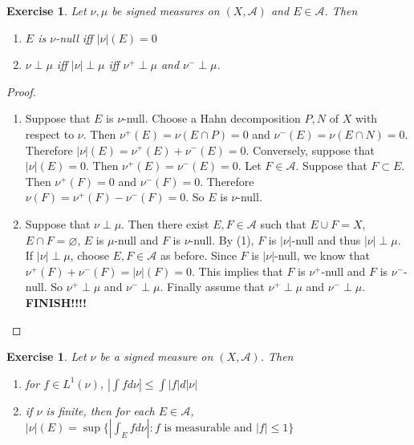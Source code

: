\documentclass[12pt]{amsart}
\newtheorem{ex}[thm]{Exercise}
\newcommand{\MA}{\mathcal{A}}
\begin{document}
	\begin{ex}
		Let $\nu, \mu$ be signed measures on $(X,\MA)$ and $E \in \MA$. Then 
		\begin{enumerate}
			\item $E$ is $\nu$-null iff $|\nu|(E) = 0$
			\item $\nu \perp \mu$ iff $|\nu| \perp \mu$ iff $\nu^+ \perp \mu$ and $\nu^- \perp \mu$.
		\end{enumerate}
	\end{ex}
	
	\begin{proof}
		\begin{enumerate}
			\item Suppose that $E$ is $\nu$-null. Choose a Hahn decomposition $P,N$ of $X$ with respect to $\nu$. Then $\nu^+(E) = \nu(E \cap P) = 0$ and $\nu^-(E) = \nu(E \cap N) = 0$. Therefore $|\nu|(E) = \nu^+(E) + \nu^-(E) = 0$. Conversely, suppose that $|\nu|(E) = 0$. Then $\nu^+(E) = \nu^-(E) = 0$. Let $F \in \MA$. Suppose that $F \subset E$. Then $\nu^+(F) = 0$ and $\nu^-(F) = 0$. Therefore $\nu(F) = \nu^+(F) - \nu^-(F) = 0$. So $E$ is $\nu$-null.
			
			\item Suppose that $\nu \perp \mu$. Then there exist $E,F \in \MA$ such that $E \cup F = X$, $E \cap F = \varnothing$, $E$ is $\mu$-null and $F$ is $\nu$-null. By (1), $F$ is $|\nu|$-null and thus $|\nu| \perp \mu$. If $|\nu| \perp \mu$, choose $E,F \in \MA$ as before. Since $F$ is $|\nu|$-null, we know that $\nu^+(F) + \nu^-(F) = |\nu|(F) = 0$. This implies that $F$ is $\nu^+$-null and $F$ is $\nu^-$-null. So $\nu^+ \perp \mu$ and $\nu^- \perp \mu$. Finally assume that $\nu^+ \perp \mu$ and $\nu^- \perp \mu$. \textbf{FINISH!!!!}
			
		\end{enumerate}
	\end{proof}
	
	\begin{ex}
		Let $\nu$ be a signed measure on $(X, \MA)$. Then 
		\begin{enumerate}
			\item for $f \in L^1(\nu)$, $|\int f d \nu| \leq \int |f| d |\nu|$
			\item if $\nu$ is finite, then for each $E \in \MA$, $|\nu|(E) = \sup \{|\int_E f d \nu |: f  \text{ is measurable and } |f| \leq 1 \}$
		\end{enumerate}
	\end{ex}
	
\end{document}
